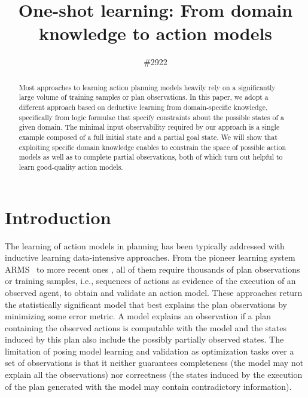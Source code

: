 \documentclass{article}
\title{One-shot learning: From domain knowledge to action models}
\author{\#2922}
\newcommand{\ARMS}{{\small {\sffamily ARMS}}\xspace}
\begin{document}
\maketitle


\begin{abstract}
Most approaches to learning action planning models heavily rely on a significantly large volume of training samples or plan observations. In this paper, we adopt a different approach based on deductive learning from domain-specific knowledge, specifically from logic formulae that specify constraints about the possible states of a given domain. The minimal input observability required by our approach is a single example composed of a full initial state and a partial goal state. We will show that exploiting specific domain knowledge enables to constrain the space of possible action models as well as to complete partial observations, both of which turn out helpful to learn good-quality action models.
 \end{abstract}



\section{Introduction}
\label{sec:introduction}

The learning of action models in planning has been typically addressed with inductive learning data-intensive approaches. From the pioneer learning system \ARMS~\cite{yang2007learning} to more recent ones \cite{MouraoZPS12,zhuo2013action,kuvcera2018louga}, all of them require thousands of plan observations or training samples, i.e., sequences of actions as evidence of the execution of an observed agent, to obtain and validate an action model. These approaches return the statistically significant model that best explains the plan observations by minimizing some error metric. A model explains an observation if a plan containing the observed actions is computable with the model and the states induced by this plan also include the possibly partially observed states. The limitation of posing model learning and validation as optimization tasks over a set of observations is that it neither guarantees completeness (the model may not explain all the observations) nor correctness (the states induced by the execution of the plan generated with the model may contain contradictory information).
\end{document}
